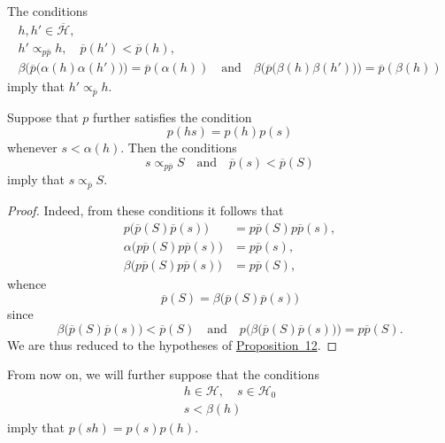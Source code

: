 \documentclass[a4paper,fleqn]{article}
\theoremstyle{plain}
\newenvironment{corollary}[1]
  {\renewcommand\theinnercorollary{#1}\innercorollary}
  {\endinnercorollary}
\theoremstyle{definition}
\newcommand{\oldpage}[1]{{\marginpar{\footnotesize$\bigg\vert$\,\,\,\,\textit{p.~#1}}}}
\newcommand{\textand}{\quad\text{and}\quad}
\newcommand{\HH}{\mathcal{H}}
\newcommand{\bHH}{\overline{\HH}}
\newcommand{\subs}{\mathrel{\propto}}
\begin{document}
\begin{corollary}{1}
  \oldpage{374}
  The conditions
  \[
    \begin{gathered}
      h,h'\in\bHH,
    \\h'\subs_{p\overline{p}}h,
      \quad \overline{p}(h') < \overline{p}(h),
    \\\beta\big(
        \overline{p}\big(\alpha(h)\alpha(h')\big)
      \big) = \overline{p}(\alpha(h))
      \textand
      \beta\big(
        \overline{p}\big(\beta(h)\beta(h')\big)
      \big) = \overline{p}(\beta(h))
    \end{gathered}
  \]
  imply that $h'\subs_{\overline{p}}h$.
\end{corollary}

\begin{corollary}{2}
  Suppose that $p$ further satisfies the condition
  \[
    p(hs)
    = p(h)p(s)
  \]
  whenever $s<\alpha(h)$.
  Then the conditions
  \[
    s\subs_{p\overline{p}}S
    \textand
    \overline{p}(s) < \overline{p}(S)
  \]
  imply that $s\subs_{\overline{p}}S$.
\end{corollary}

\begin{proof}
  Indeed, from these conditions it follows that
  \[
    \begin{aligned}
      p\big(
        \overline{p}(S)\overline{p}(s)
      \big)
      &= p\overline{p}(S)p\overline{p}(s),
    \\\alpha\big(
        p\overline{p}(S)p\overline{p}(s)
      \big)
      &= p\overline{p}(s),
    \\\beta\big(
        p\overline{p}(S)p\overline{p}(s)
      \big)
      &= p\overline{p}(S),
    \end{aligned}
  \]
  whence
  \[
    \overline{p}(S)
    = \beta\big(
      \overline{p}(S)\overline{p}(s)
    \big)
  \]
  since
  \[
    \beta\big(
      \overline{p}(S)\overline{p}(s)
    \big) < \overline{p}(S)
    \textand
    p\big(
      \beta\big(
        \overline{p}(S)\overline{p}(s)
      \big)
    \big) = p\overline{p}(S).
  \]
  We are thus reduced to the hypotheses of \hyperref[proposition:i-12]{Proposition~12}.
\end{proof}

From now on, we will further suppose that the conditions
\[
  \begin{gathered}
    h\in\HH,
    \quad s\in\HH_0
  \\s < \beta(h)
  \end{gathered}
\]
imply that $p(sh)=p(s)p(h)$.
\end{document}

